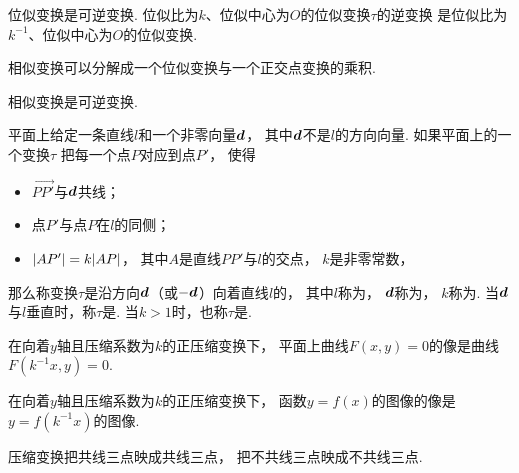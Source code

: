 \begin{proposition}
位似变换是可逆变换.
位似比为\(k\)、位似中心为\(O\)的位似变换\(\tau\)的逆变换
是位似比为\(k^{-1}\)、位似中心为\(O\)的位似变换.
\end{proposition}

\begin{proposition}
相似变换可以分解成一个位似变换与一个正交点变换的乘积.
\end{proposition}

\begin{proposition}
相似变换是可逆变换.
\end{proposition}

\begin{definition}
平面上给定一条直线\(l\)和一个非零向量\(\boldsymbol{d}\)，
其中\(\boldsymbol{d}\)不是\(l\)的方向向量.
如果平面上的一个变换\(\tau\)
把每一个点\(P\)对应到点\(P'\)，
使得\begin{itemize}
	\item \(\vec{PP'}\)与\(\boldsymbol{d}\)共线；
	\item 点\(P'\)与点\(P\)在\(l\)的同侧；
	\item \(\abs{AP'} = k \abs{AP}\)，
	其中\(A\)是直线\(PP'\)与\(l\)的交点，
	\(k\)是非零常数，
\end{itemize}
那么称变换\(\tau\)是沿方向\(\boldsymbol{d}\)（或\(-\boldsymbol{d}\)）向着直线\(l\)的，
其中\(l\)称为，
\(\boldsymbol{d}\)称为，
\(k\)称为.
当\(\boldsymbol{d}\)与\(l\)垂直时，称\(\tau\)是.
当\(k>1\)时，也称\(\tau\)是.
\end{definition}

\begin{proposition}
在向着\(y\)轴且压缩系数为\(k\)的正压缩变换下，
平面上曲线\(F(x,y) = 0\)的像是曲线\(F(k^{-1}x,y) = 0\).
\end{proposition}

\begin{corollary}
在向着\(y\)轴且压缩系数为\(k\)的正压缩变换下，
函数\(y = f(x)\)的图像的像是\(y = f(k^{-1} x)\)的图像.
\end{corollary}

\begin{proposition}
压缩变换把共线三点映成共线三点，
把不共线三点映成不共线三点.
\end{proposition}

